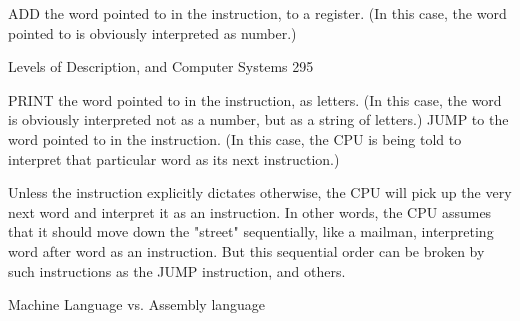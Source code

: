        ADD the word pointed to in the instruction, to a register.
             (In this case, the word pointed to is obviously interpreted as number.)




Levels of Description, and Computer Systems                                               295

               PRINT the word pointed to in the instruction, as letters.
               (In this case, the word is obviously interpreted not as a number, but as a
       string of letters.)
               JUMP to the word pointed to in the instruction.
               (In this case, the CPU is being told to interpret that particular word as its
       next instruction.)

               Unless the instruction explicitly dictates otherwise, the CPU will pick up
       the very next word and interpret it as an instruction. In other words, the CPU
       assumes that it should move down the "street" sequentially, like a mailman,
       interpreting word after word as an instruction. But this sequential order can be
       broken by such instructions as the JUMP instruction, and others.

                              Machine Language vs. Assembly language

